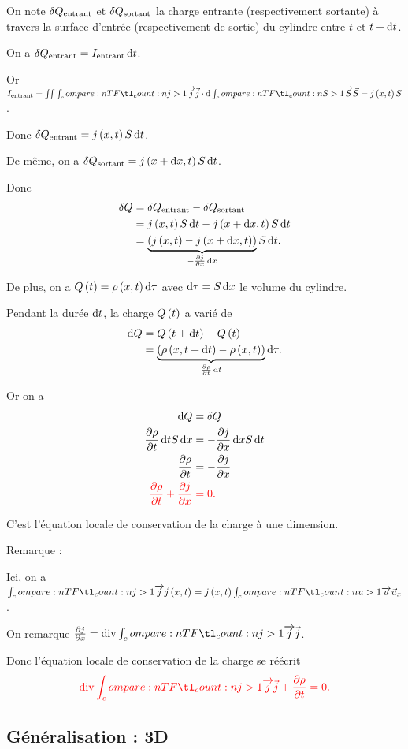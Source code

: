 On note \(\fdif{Q_\entrant}\) et \(\fdif{Q_\sortant}\) la charge entrante (respectivement sortante) à travers la surface d'entrée (respectivement de sortie) du cylindre entre \(t\) et \(t+\odif{t}\).

On a \(\fdif{Q_\entrant}=I_\entrant\odif{t}\).

Or \(I_\entrant=\iint\v{j}\scal\odif{\v{S}}=j\paren{x,t}S\).

Donc \(\fdif{Q_\entrant}=j\paren{x,t}S\odif{t}\).

De même, on a \(\fdif{Q_\sortant}=j\paren{x+\odif{x},t}S\odif{t}\).

Donc \[\begin{aligned}
\fdif{Q}&=\fdif{Q_\entrant}-\fdif{Q_\sortant} \\
&=j\paren{x,t}S\odif{t}-j\paren{x+\odif{x},t}S\odif{t} \\
&=\underbrace{\paren{j\paren{x,t}-j\paren{x+\odif{x},t}}}_{-\pdv{j}{x}\odif{x}}S\odif{t}.
\end{aligned}\]

De plus, on a \(Q\paren{t}=\rho\paren{x,t}\odif{\tau}\) avec \(\odif{\tau}=S\odif{x}\) le volume du cylindre.

Pendant la durée \(\odif{t}\), la charge \(Q\left(t\right)\) a varié de \[\begin{aligned}
\odif{Q}&=Q\paren{t+\odif{t}}-Q\paren{t} \\
&=\underbrace{\paren{\rho\paren{x,t+\odif{t}}-\rho\paren{x,t}}}_{\pdv{\rho}{t}\odif{t}}\odif{\tau}.
\end{aligned}\]

Or on a \[\begin{aligned}
\odif{Q}&=\fdif{Q} \\
\pdv{\rho}{t}\odif{t}S\odif{x}&=-\pdv{j}{x}\odif{x}S\odif{t} \\
\pdv{\rho}{t}&=-\pdv{j}{x} \\
\color{red}\pdv{\rho}{t}+\pdv{j}{x}&\color{red}=0.\color{black}
\end{aligned}\]

C'est l'équation locale de conservation de la charge à une dimension.

Remarque :

Ici, on a \(\v{j}\paren{x,t}=j\paren{x,t}\v{u}_x\).

On remarque \(\pdv{j}{x}=\div\v{j}\).

Donc l'équation locale de conservation de la charge se réécrit \[\color{red}\div\v{j}+\pdv{\rho}{t}=0.\color{black}\]

\subsection{Généralisation : 3D}

